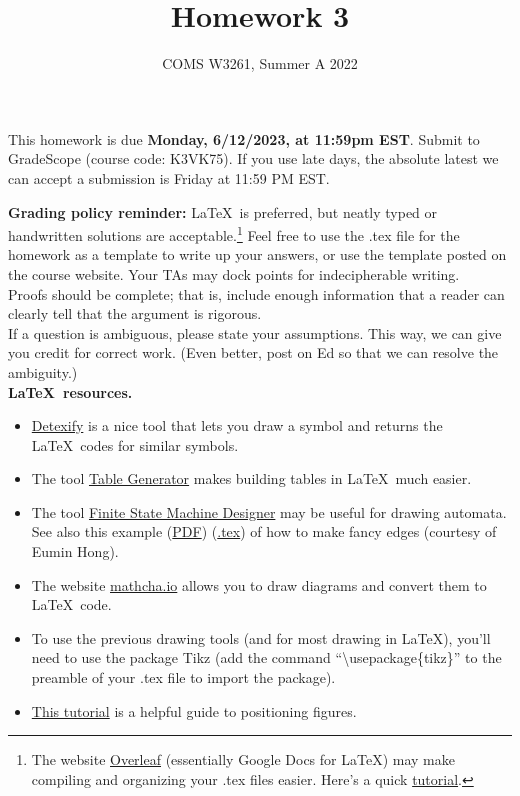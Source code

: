 \documentclass[letterpaper,11pt,twoside]{article}
\title{Homework 3}
\date{COMS W3261, Summer A 2022}
\theoremstyle{plain}
\theoremstyle{definition}
\theoremstyle{remark}
\theoremstyle{restate}
\begin{document}
\maketitle

This homework is due \textbf{Monday, 6/12/2023, at 11:59pm EST}. Submit to GradeScope (course code: K3VK75). If you use late days, the absolute latest we can accept a submission is Friday at 11:59 PM EST.

\textbf{Grading policy reminder:} \LaTeX~is preferred, but neatly typed or handwritten solutions are acceptable.\footnote{The website \href{https://www.overleaf.com/}{Overleaf} (essentially Google Docs for LaTeX) may make compiling and organizing your .tex files easier. Here's a quick \href{https://www.overleaf.com/learn/latex/Learn_LaTeX_in_30_minutes}{tutorial}.} Feel free to use the .tex file for the homework as a template to write up your answers, or use the template posted on the course website. Your TAs may dock points for indecipherable writing.\\

Proofs should be complete; that is, include enough information that a reader can clearly tell that the argument is rigorous. \\

If a question is ambiguous, please state your assumptions. This way, we can give you credit for correct work. (Even better, post on Ed so that we can resolve the ambiguity.) \\

\textbf{\LaTeX~resources.}
\begin{itemize}
    \item \href{https://detexify.kirelabs.org/classify.html}{Detexify} is a nice tool that lets you draw a symbol and returns the \LaTeX~codes for similar symbols. 
    \item The tool \href{https://www.tablesgenerator.com/}{Table Generator} makes building tables in \LaTeX~much easier.
    \item The tool \href{http://madebyevan.com/fsm/}{Finite State Machine Designer} may be useful for drawing automata. See also this example (\href{https://static.us.edusercontent.com/files/HZeTXimODzWeLvHIqsvjL2BG}{PDF}) (\href{https://static.us.edusercontent.com/files/RI3W8tQNvHMWFe9MkXV1KztA}{.tex}) of how to make fancy edges (courtesy of Eumin Hong).
    \item The website \href{https://www.mathcha.io/}{mathcha.io} allows you to draw diagrams and convert them to \LaTeX~code.
    \item To use the previous drawing tools (and for most drawing in \LaTeX), you'll need to use the package Tikz (add the command ``\textbackslash usepackage\{tikz\}'' to the preamble of your .tex file to import the package). 
    \item \href{https://www.overleaf.com/learn/latex/Positioning_of_Figures}{This tutorial} is a helpful guide to positioning figures.
\end{itemize}  
\end{document}
